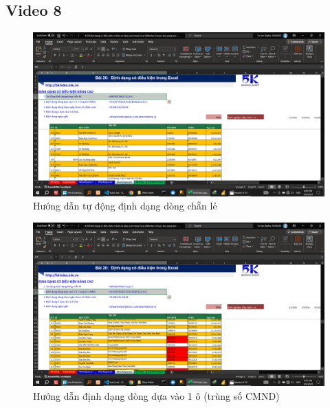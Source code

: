\documentclass{article}
\begin{document}


\subsection{Video 8}
\begin{figure}[H]
\centering
\includegraphics[scale = 0.15]{Video8/HuongDan/0.png}
\caption{Hướng dẫn tự động định dạng dòng chẵn lẻ}
\end{figure}

\begin{figure}[H]
\centering
\includegraphics[scale = 0.15]{Video8/HuongDan/1.png}
\caption{Hướng dẫn định dạng dòng dựa vào 1 ô (trùng số CMND)}
\end{figure}
\end{document}
